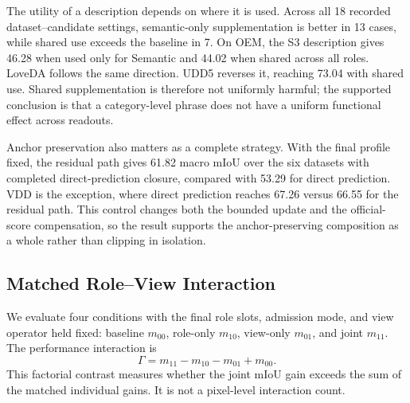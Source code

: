The utility of a description depends on where it is used. Across all 18 recorded dataset--candidate settings, semantic-only supplementation is better in 13 cases, while shared use exceeds the baseline in 7. On OEM, the S3 description gives 46.28 when used only for Semantic and 44.02 when shared across all roles. LoveDA follows the same direction. UDD5 reverses it, reaching 73.04 with shared use. Shared supplementation is therefore not uniformly harmful; the supported conclusion is that a category-level phrase does not have a uniform functional effect across readouts.

Anchor preservation also matters as a complete strategy. With the final profile fixed, the residual path gives 61.82 macro mIoU over the six datasets with completed direct-prediction closure, compared with 53.29 for direct prediction. VDD is the exception, where direct prediction reaches 67.26 versus 66.55 for the residual path. This control changes both the bounded update and the official-score compensation, so the result supports the anchor-preserving composition as a whole rather than clipping in isolation.

\subsection{Matched Role--View Interaction}

We evaluate four conditions with the final role slots, admission mode, and view operator held fixed: baseline $m_{00}$, role-only $m_{10}$, view-only $m_{01}$, and joint $m_{11}$. The performance interaction is
\begin{equation}
\Gamma=m_{11}-m_{10}-m_{01}+m_{00}.
\label{eq:interaction}
\end{equation}
This factorial contrast measures whether the joint mIoU gain exceeds the sum of the matched individual gains. It is not a pixel-level interaction count.


